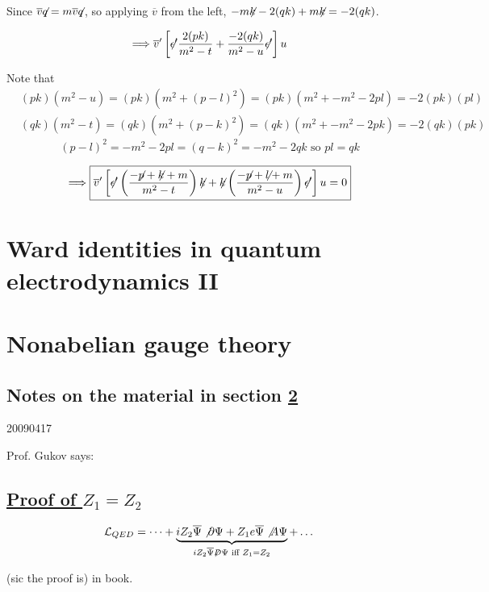 \documentclass[twoside]{amsart}
\begin{document}
Since $ \overline{v} {\not}{q} = m \overline{v}{\not}{q}$,  so applying $\overline{v}$ from the left, $- m {\not}{k} - 2(qk) + m {\not}{k} = -2 (qk)$.  

\[
\Longrightarrow \overline{v}' \left[ {\not}{\epsilon}' \frac{ 2(pk) }{ m^2 - t} + \frac{ -2(qk) }{ m^2 -u } {\not}{\epsilon} ' \right] u 
\]

Note that 
\[
\begin{aligned}
  & (pk) ( m^2 - u)  = (pk) ( m^2 + (p-l)^2 ) = (pk) ( m^2 + -m^2  - 2pl ) = -2(pk)( pl) \\ 
  & (qk)( m^2  -t) = (qk) (m^2 + (p-k)^2 ) = (qk) ( m^2 + -m^2 - 2pk) = -2(qk) ( pk) 
\end{aligned}
\]
\[
(p-l)^2 = -m^2 - 2pl = (q-k)^2 = - m^2 - 2qk \text{ so } pl = qk 
\]

\[
\Longrightarrow \boxed{ \overline{v}' \left[ {\not}{\epsilon}' \left( \frac{ - {\not}{p} + {\not}{k} + m }{ m^2  - t } \right)  {\not}{k} + {\not}{k }  \left(  \frac{ - {\not}{p } + {\not}{l } + m }{ m^2 - u } \right) {\not}{\epsilon}' \right] u =0  }
\]



\section{Ward identities in quantum electrodynamics II}


\section{Nonabelian gauge theory }\label{Sec:NonabelianGaugeTheory}

\subsection*{Notes on the material in section \ref{Sec:NonabelianGaugeTheory}}

20090417

Prof. Gukov says:

\subsection*{ \underline{Proof of $Z_1 = Z_2$ } }

\[
\mathcal{L}_{QED} = \dots  + \underbrace{ i Z_{2}  \overline{ \Psi} \not \partial \Psi  + Z_1 e \overline{ \Psi} \not A \Psi }_{ i Z_2 \overline{ \Psi } \not D \Psi  \text{ iff } Z_1 = Z_2 } + \dots 
\]

(sic the proof is) in book.  
\end{document}

